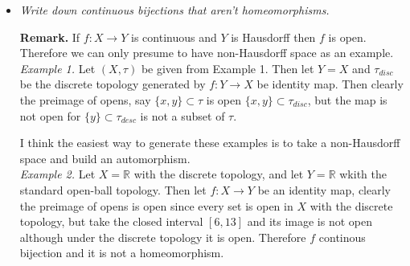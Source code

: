 \documentclass[11pt]{amsart}
\theoremstyle{definition}
\numberwithin{theorem}{section}
\numberwithin{definition}{section}
\numberwithin{equation}{section}
\begin{document}
\begin{itemize}
 	Since this is true for every pair of open neighborhoods $\tilde U, \tilde V$ the space could not be Hausdorff\footnote{I like this example.}. 


 	\item \emph{Write down continuous bijections that aren't homeomorphisms.}

 		 \noindent \textbf{Remark.} If $f: X \to Y$ is continuous and $Y$ is  Hausdorff then $f$ is open. Therefore we can only presume to have non-Hausdorff space as an example. \\


 		 \noindent \emph{Example 1.} Let $(X, \tau)$ be given from Example 1.  Then let $Y = X$ and $\tau_{disc}$ be the discrete topology generated by $f: Y \to X$ be identity map. Then clearly the preimage of opens, say $\{x, y\} \subset \tau$ is open $\{x,y\} \subset \tau_{disc}$, but the map is not open for $\{y\} \subset \tau_{desc}$ is not a subset of $\tau$.


 		 I think the easiest way to generate these examples is to take a non-Hausdorff space and build an automorphism. \\

 		 \noindent \emph{Example 2.} Let $X = \mathbb{R}$ with the discrete topology, and let $Y = \mathbb{R}$ wkith the standard open-ball topology. Then let $f: X \to Y$ be an identity map, clearly the preimage of opens is open since every set is open in $X$ with the discrete topology, but take the closed interval $[6,13]$ and its image is not open although under the discrete topology it is open. Therefore $f$ continous bijection and it is not a homeomorphism.  

 \end{itemize} 
\end{document}
